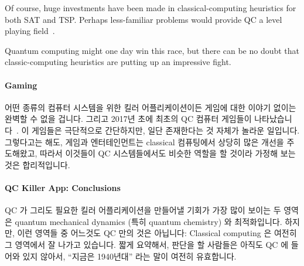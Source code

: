 Of course, huge investments have been made in classical-computing
heuristics for both SAT and TSP.
Perhaps less-familiar problems would provide QC a level
playing field~\cite{JohnPreskill2018NISQ}.

Quantum computing might one day win this race, but there can be no doubt that
classic-computing heuristics are putting up an impressive fight.
\fi

\paragraph{Gaming}
\label{sec:future:Gaming}

어떤 종류의 컴퓨터 시스템을 위한 킬러 어플리케이션이든 게임에 대한 이야기
없이는 완벽할 수 없을 겁니다.
그리고 2017년 초에 최초의 QC 컴퓨터 게임들이
나타났습니다~\cite{JamesWootton2017IBMQEgame,JamesWootton2017IBMQEbattleship}.
이 게임들은 극단적으로 간단하지만, 일단 존재한다는 것 자체가 놀라운 일입니다.
그렇다고는 해도, 게임과 엔터테인먼트는 classical 컴퓨팅에서 상당히 많은 개선을
주도해왔고, 따라서 이것들이 QC 시스템들에서도 비슷한 역할을 할 것이라 가정해
보는 것은 합리적입니다.

\paragraph{QC Killer App: Conclusions}
\label{sec:future:QC Killer App: Conclusions}

QC 가 그리도 필요한 킬러 어플리케이션을 만들어낼 기회가 가장 많이 보이는 두
영역은 quantum mechanical dynamics (특히 quantum chemistry) 와 최적화입니다.
하지만, 이런 영역들 중 어느것도 QC 만의 것은 아닙니다: Classical computing 은
여전히 그 영역에서 잘 나가고 있습니다.
짧게 요약해서, 판단을 할 사람들은 아직도 QC 에 들어와 있지 않아서, ``지금은
1940년대'' 라는 말이 여전히 유효합니다.

